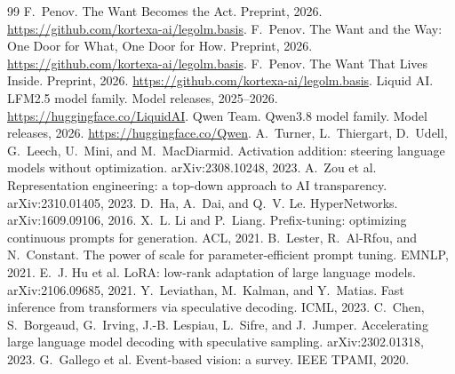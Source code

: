 \documentclass[11pt]{article}
\begin{document}
\begin{thebibliography}{99}
 F.~Penov. The Want Becomes the Act. Preprint,
2026. \url{https://github.com/kortexa-ai/legolm.basis}.
 F.~Penov. The Want and the Way: One Door for
What, One Door for How. Preprint, 2026.
\url{https://github.com/kortexa-ai/legolm.basis}.
 F.~Penov. The Want That Lives Inside.
Preprint, 2026. \url{https://github.com/kortexa-ai/legolm.basis}.
 Liquid AI. LFM2.5 model family. Model releases,
2025--2026. \url{https://huggingface.co/LiquidAI}.
 Qwen Team. Qwen3.8 model family. Model releases,
2026. \url{https://huggingface.co/Qwen}.
 A.~Turner, L.~Thiergart, D.~Udell, G.~Leech,
U.~Mini, and M.~MacDiarmid. Activation addition: steering language
models without optimization. arXiv:2308.10248, 2023.
 A.~Zou et al. Representation engineering: a
top-down approach to AI transparency. arXiv:2310.01405, 2023.
 D.~Ha, A.~Dai, and Q.~V. Le. HyperNetworks.
arXiv:1609.09106, 2016.
 X.~L. Li and P.~Liang. Prefix-tuning: optimizing
continuous prompts for generation. ACL, 2021.
 B.~Lester, R.~Al-Rfou, and N.~Constant. The power
of scale for parameter-efficient prompt tuning. EMNLP, 2021.
 E.~J. Hu et al. LoRA: low-rank adaptation of large
language models. arXiv:2106.09685, 2021.
 Y.~Leviathan, M.~Kalman, and Y.~Matias. Fast
inference from transformers via speculative decoding. ICML, 2023.
 C.~Chen, S.~Borgeaud, G.~Irving, J.-B. Lespiau,
L.~Sifre, and J.~Jumper. Accelerating large language model decoding
with speculative sampling. arXiv:2302.01318, 2023.
 G.~Gallego et al. Event-based vision: a survey.
IEEE TPAMI, 2020.
\end{thebibliography}
\end{document}
